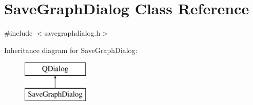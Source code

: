 \hypertarget{class_save_graph_dialog}{}\section{Save\+Graph\+Dialog Class Reference}
\label{class_save_graph_dialog}


{\ttfamily \#include $<$savegraphdialog.\+h$>$}

Inheritance diagram for Save\+Graph\+Dialog\+:\begin{figure}[H]
\begin{center}
\leavevmode
\includegraphics[height=2.000000cm]{dd/d81/class_save_graph_dialog}
\end{center}
\end{figure}
